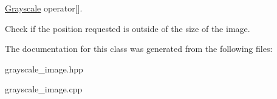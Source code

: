 \hyperlink{classhwlib_1_1Grayscale}{Grayscale} operator\mbox{[}\mbox{]}. 

Check if the position requested is outside of the size of the image. 

The documentation for this class was generated from the following files\+:\begin{DoxyCompactItemize}
\item 
grayscale\+\_\+image.\+hpp\item 
grayscale\+\_\+image.\+cpp\end{DoxyCompactItemize}
